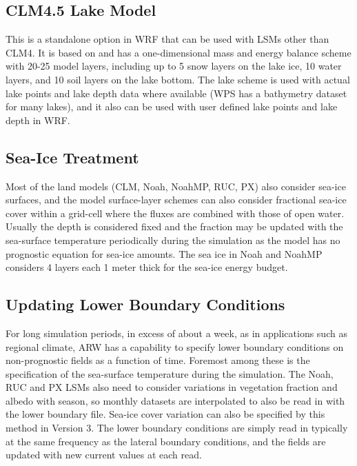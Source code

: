 \subsection{CLM4.5 Lake Model}

This is a standalone option in WRF that can be used with LSMs other than CLM4. It is based on \citet{subin12} and has a 
one-dimensional mass and energy balance scheme with 20-25 model layers,
including up to 5 snow layers on the lake ice, 10 water layers, and 10 soil
layers on the lake bottom. The lake scheme is used with actual lake points and
lake depth data where available (WPS has a bathymetry dataset for many lakes), and it also can be used with user defined
lake points and lake depth in WRF.

\subsection{Sea-Ice Treatment}

Most of the land models (CLM, Noah, NoahMP, RUC, PX) also consider sea-ice surfaces, and the model surface-layer schemes
can also consider fractional sea-ice cover within a grid-cell where the fluxes are combined with those of open water.
Usually the depth is considered fixed and the fraction may be updated with the sea-surface temperature periodically
during the simulation as the model has no prognostic equation for sea-ice amounts.
The sea ice in Noah and NoahMP considers 4 layers each 1 meter thick for the sea-ice energy budget.

\subsection{Updating Lower Boundary Conditions}

For long simulation periods, in excess of about a week, as in applications such as 
regional climate, ARW has a capability to specify lower boundary conditions 
on non-prognostic fields as
a function of time. Foremost among these is the specification of the 
sea-surface temperature during the simulation. The Noah, RUC and PX LSMs also
need to consider variations in vegetation fraction and albedo with season, so
monthly datasets are interpolated to also be read in with the lower boundary file.
Sea-ice cover variation can also be specified by this method in Version 3.
The lower boundary conditions are simply read in typically at the
same frequency as the lateral boundary conditions, and the fields are
updated with new current values at each read.

